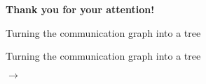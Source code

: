 \documentclass{beamer}
\begin{document}
\begin{frame}{}
	
	\Huge \textbf{Thank you for your attention!}
	
\end{frame}

\appendix
\begin{frame}
\end{frame}


\begin{frame}{Turning the communication graph into a tree}
\centering

\end{frame}

\begin{frame}{Turning the communication graph into a tree}
\begin{minipage}{0.55\linewidth}
\centering
\resizebox{6.5cm}{!}{

}
\end{minipage}
\begin{minipage}{0.1\linewidth}
$\longrightarrow$
\end{minipage}
\begin{minipage}{0.25 \linewidth}
\resizebox{!}{5cm}{

}
\end{minipage}
\hfill
\end{frame}
\end{document}
